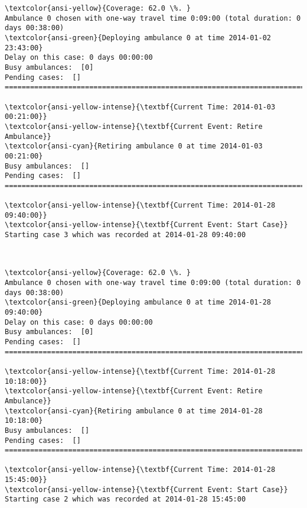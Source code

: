 \documentclass[11pt]{article}
\begin{document}
    \begin{Verbatim}[commandchars=\\\{\}]
\textcolor{ansi-yellow}{Coverage: 62.0 \%. }
Ambulance 0 chosen with one-way travel time 0:09:00 (total duration: 0 days 00:38:00)
\textcolor{ansi-green}{Deploying ambulance 0 at time 2014-01-02 23:43:00}
Delay on this case: 0 days 00:00:00
Busy ambulances:  [0]
Pending cases:  []
========================================================================

\textcolor{ansi-yellow-intense}{\textbf{Current Time: 2014-01-03 00:21:00}}
\textcolor{ansi-yellow-intense}{\textbf{Current Event: Retire Ambulance}}
\textcolor{ansi-cyan}{Retiring ambulance 0 at time 2014-01-03 00:21:00}
Busy ambulances:  []
Pending cases:  []
========================================================================

\textcolor{ansi-yellow-intense}{\textbf{Current Time: 2014-01-28 09:40:00}}
\textcolor{ansi-yellow-intense}{\textbf{Current Event: Start Case}}
Starting case 3 which was recorded at 2014-01-28 09:40:00

    \end{Verbatim}

    \begin{center}
    \end{center}
    { \hspace*{\fill} \\}
    
    \begin{Verbatim}[commandchars=\\\{\}]
\textcolor{ansi-yellow}{Coverage: 62.0 \%. }
Ambulance 0 chosen with one-way travel time 0:09:00 (total duration: 0 days 00:38:00)
\textcolor{ansi-green}{Deploying ambulance 0 at time 2014-01-28 09:40:00}
Delay on this case: 0 days 00:00:00
Busy ambulances:  [0]
Pending cases:  []
========================================================================

\textcolor{ansi-yellow-intense}{\textbf{Current Time: 2014-01-28 10:18:00}}
\textcolor{ansi-yellow-intense}{\textbf{Current Event: Retire Ambulance}}
\textcolor{ansi-cyan}{Retiring ambulance 0 at time 2014-01-28 10:18:00}
Busy ambulances:  []
Pending cases:  []
========================================================================

\textcolor{ansi-yellow-intense}{\textbf{Current Time: 2014-01-28 15:45:00}}
\textcolor{ansi-yellow-intense}{\textbf{Current Event: Start Case}}
Starting case 2 which was recorded at 2014-01-28 15:45:00

    \end{Verbatim}
\end{document}
